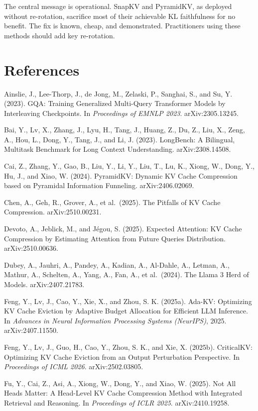 \documentclass[10pt,letterpaper]{article}
\begin{document}
The central message is operational. SnapKV and PyramidKV, as deployed
without re-rotation, sacrifice most of their achievable KL faithfulness
for no benefit. The fix is known, cheap, and demonstrated. Practitioners
using these methods should add key re-rotation.

\hypertarget{references}{%
\section{References}\label{references}}

Ainslie, J., Lee-Thorp, J., de Jong, M., Zelaski, P., Sanghai, S., and
Su, Y. (2023). GQA: Training Generalized Multi-Query Transformer Models
by Interleaving Checkpoints. In \emph{Proceedings of EMNLP 2023}.
arXiv:2305.13245.

Bai, Y., Lv, X., Zhang, J., Lyu, H., Tang, J., Huang, Z., Du, Z., Liu,
X., Zeng, A., Hou, L., Dong, Y., Tang, J., and Li, J. (2023). LongBench:
A Bilingual, Multitask Benchmark for Long Context Understanding.
arXiv:2308.14508.

Cai, Z., Zhang, Y., Gao, B., Liu, Y., Li, Y., Liu, T., Lu, K., Xiong,
W., Dong, Y., Hu, J., and Xiao, W. (2024). PyramidKV: Dynamic KV Cache
Compression based on Pyramidal Information Funneling. arXiv:2406.02069.

Chen, A., Geh, R., Grover, A., et al.~(2025). The Pitfalls of KV Cache
Compression. arXiv:2510.00231.

Devoto, A., Jeblick, M., and Jégou, S. (2025). Expected Attention: KV
Cache Compression by Estimating Attention from Future Queries
Distribution. arXiv:2510.00636.

Dubey, A., Jauhri, A., Pandey, A., Kadian, A., Al-Dahle, A., Letman, A.,
Mathur, A., Schelten, A., Yang, A., Fan, A., et al.~(2024). The Llama 3
Herd of Models. arXiv:2407.21783.

Feng, Y., Lv, J., Cao, Y., Xie, X., and Zhou, S. K. (2025a). Ada-KV:
Optimizing KV Cache Eviction by Adaptive Budget Allocation for Efficient
LLM Inference. In \emph{Advances in Neural Information Processing
Systems (NeurIPS)}, 2025. arXiv:2407.11550.

Feng, Y., Lv, J., Guo, H., Cao, Y., Zhou, S. K., and Xie, X. (2025b).
CriticalKV: Optimizing KV Cache Eviction from an Output Perturbation
Perspective. In \emph{Proceedings of ICML 2026}. arXiv:2502.03805.

Fu, Y., Cai, Z., Asi, A., Xiong, W., Dong, Y., and Xiao, W. (2025). Not
All Heads Matter: A Head-Level KV Cache Compression Method with
Integrated Retrieval and Reasoning. In \emph{Proceedings of ICLR 2025}.
arXiv:2410.19258.
\end{document}
